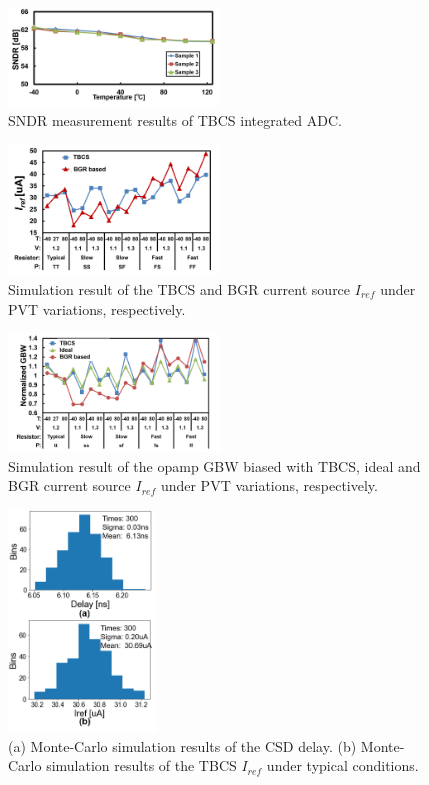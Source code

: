 \documentclass[letterpaper, 10 pt, conference]{ieeeconf}  %
\begin{document}
\begin{figure}[!]
\centering
 \includegraphics[width=0.5\textwidth]{figs/sndr.png}
  \caption{SNDR measurement results of TBCS integrated ADC.}
\label{sndr}
\end{figure}

\begin{figure}[!]
\centering
 \includegraphics[width=0.5\textwidth]{figs/pvt.png}
  \caption{Simulation result of the TBCS and BGR current source $I_{ref}$ under PVT variations, respectively.
}
\label{iref_pvt_both}
\end{figure}

\begin{figure}[!]
\centering
 \includegraphics[width=0.5\textwidth]{figs/pvt_gbw.png}
  \caption{Simulation result of the opamp GBW biased with TBCS, ideal and BGR current source $I_{ref}$ under PVT variations, respectively.
}
\label{iref_gbw}
\end{figure}

\begin{figure}[!]
\centering
 \includegraphics[width=0.35\textwidth]{figs/mc.png}
  \caption{(a) Monte-Carlo simulation results of the CSD delay. (b) Monte-Carlo simulation results of the TBCS $I_{ref}$ under typical conditions.
}
\label{monte}
\end{figure}
\end{document}
